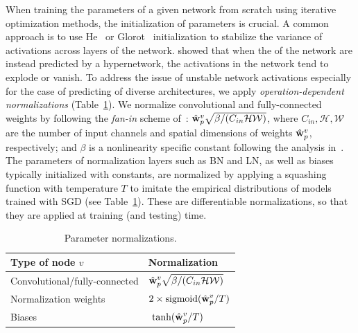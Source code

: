 When training the parameters of a given network from scratch using iterative optimization methods, the initialization of parameters is crucial. A common approach is to use He~\citep{he2015delving} or Glorot~\citep{glorot2010understanding} initialization to stabilize the variance of activations across layers of the network.
\citet{chang2019principled} showed that when the \params of the network are instead predicted by a hypernetwork, the activations in the network tend to explode or vanish.
To address the issue of unstable network activations especially for the case of predicting \params of diverse architectures, we apply \emph{operation-dependent normalizations} (Table~\ref{tab:norm}).
We normalize convolutional and fully-connected weights by following the \emph{fan-in} scheme of~\citep{he2015delving}:
$\hat{\mathbf{w}}_{p}^{v}\sqrt{{\beta}/{(C_{in}\mathcal{HW})}}$, where $C_{in},\mathcal{H,W}$ are the number of input channels and spatial dimensions of weights $\hat{\mathbf{w}}_{p}^{v}$, respectively; and $\beta$ is a nonlinearity specific constant following the analysis in~\citep{he2015delving}.
The parameters of normalization layers such as BN and LN, as well as biases typically initialized with constants, are normalized by applying a squashing function with temperature $T$ to imitate the empirical distributions of models trained with SGD (see Table~\ref{tab:norm}).	
These are differentiable normalizations, so that they are applied at training (and testing) time.

\begin{table}[htbp]%
	\centering
	\footnotesize
	\caption{\small Parameter normalizations.}%
	\vspace{-5pt}
	\label{tab:norm}
	\begin{tabular}{l|l}
		\toprule
		Type of node $v$ & Normalization\Tstrut\Bstrut\\
		\midrule 
		Convolutional/fully-connected &  \(\displaystyle \hat{\mathbf{w}}_{p}^{v}\sqrt{{\beta}/{(C_{in}\mathcal{HW})}}  \)\Tstrut\\
		Normalization weights & \(\displaystyle 2 \times
		\text{sigmoid}(\hat{\mathbf{w}}_{p}^{v}/T) \) \\
		Biases & \(\displaystyle \text{ tanh}(\hat{\mathbf{w}}_{p}^{v} / T) \) \\
		\bottomrule
	\end{tabular}
\end{table}

